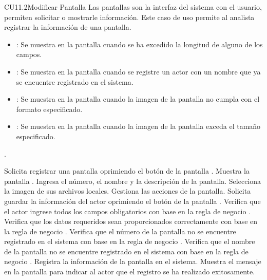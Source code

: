 \begin{UseCase}{CU11.2}{Modificar Pantalla}{
		Las pantallas son la interfaz del sistema con el usuario, permiten solicitar o mostrarle información. Este caso de uso permite al analista registrar la información de una pantalla.
	}
{\begin{itemize}
		\item {}: Se muestra en la pantalla  cuando se ha excedido la longitud de alguno de los campos.
		\item {}: Se muestra en la pantalla  cuando se registre un actor con un nombre que ya se encuentre registrado en el sistema.
		\item {}: Se muestra en la pantalla  cuando la imagen de la pantalla no cumpla con el formato especificado.
		\item {}: Se muestra en la pantalla  cuando la imagen de la pantalla exceda el tamaño especificado.
		\end{itemize}.
		}
	\end{UseCase}
	\begin{UCtrayectoria}
		\UCpaso[\UCactor] Solicita registrar una pantalla oprimiendo el botón  de la pantalla .
		\UCpaso[\UCsist] Muestra la pantalla .
		\UCpaso[\UCactor] Ingresa el número, el nombre y la descripción de la pantalla. \label{CU11.1-P3}
		\UCpaso[\UCactor] Selecciona la imagen de sus archivos locales. \label{CU11.1-P4}
		\UCpaso[\UCactor] Gestiona las acciones de la pantalla. \label{CU11.1-P5}
		\UCpaso[\UCactor] Solicita guardar la información del actor oprimiendo el botón  de la pantalla . 
		\UCpaso[\UCsist] Verifica que el actor ingrese todos los campos obligatorios con base en la regla de negocio . 
		\UCpaso[\UCsist] Verifica que los datos requeridos sean proporcionados correctamente con base en la regla de negocio .     
		\UCpaso[\UCsist] Verifica que el número de la pantalla no se encuentre registrado en el sistema con base en la regla de negocio . 
		\UCpaso[\UCsist] Verifica que el nombre de la pantalla no se encuentre registrado en el sistema con base en la regla de negocio .  
		\UCpaso[\UCsist] Registra la información de la pantalla en el sistema.
		\UCpaso[\UCsist] Muestra el mensaje  en la pantalla  para indicar al actor que el registro se ha realizado exitosamente.
	\end{UCtrayectoria}		

